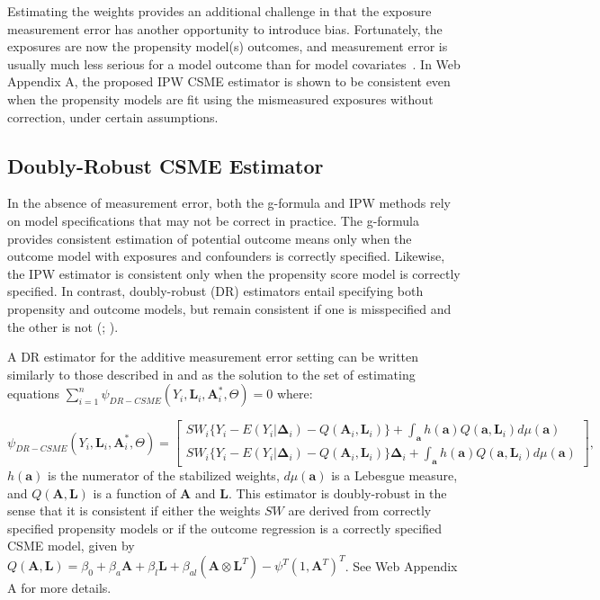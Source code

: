 \documentclass[useAMS,usenatbib,referee]{biom}
\begin{document}
Estimating the weights provides an additional challenge in that the exposure measurement error has another opportunity to introduce bias. Fortunately, the exposures are now the propensity model(s) outcomes, and measurement error is usually much less serious for a model outcome than for model covariates~\citep{carroll2006}. In Web Appendix A, the proposed IPW CSME estimator is shown to be consistent even when the propensity models are fit using the mismeasured exposures without correction, under certain assumptions.

\subsection{Doubly-Robust CSME Estimator}

In the absence of measurement error, both the g-formula and IPW methods rely on model specifications that may not be correct in practice. The g-formula provides consistent estimation of potential outcome means only when the outcome model with exposures and confounders is correctly specified. Likewise, the IPW estimator is consistent only when the propensity score model is correctly specified. In contrast, doubly-robust (DR) estimators entail specifying both propensity and outcome models, but remain consistent if one is misspecified and the other is not (\citealp*{robins1994}; \citealp{lunceford2004,bang2005}).

A DR estimator for the additive measurement error setting can be written similarly to those described in \citet{robins2000b} and \citet{neugebauer2005} as the solution to the set of estimating equations $\sum_{i=1}^{n} \psi_{DR-CSME}(Y_{i}, \bm{L}_{i}, \bm{A}^{*}_{i}, \Theta) = 0$ where:

\begin{equation*}
    \psi_{DR-CSME}(Y_{i}, \bm{L}_{i}, \bm{A}^{*}_{i}, \Theta) =
    \begin{bmatrix}
       SW_{i} \{ Y_{i} - E(Y_{i} | \bm{\Delta}_{i}) - Q(\bm{A}_{i}, \bm{L}_{i}) \} + \int_{\bm{a}} h(\bm{a})Q(\bm{a}, \bm{L}_{i})d\mu (\bm{a}) \\
       SW_{i} \{ Y_{i} - E(Y_{i} | \bm{\Delta}_{i}) - Q(\bm{A}_{i}, \bm{L}_{i}) \} \bm{\Delta}_{i} + \int_{\bm{a}} h(\bm{a})Q(\bm{a}, \bm{L}_{i})d\mu (\bm{a})
    \end{bmatrix},
\end{equation*}
$h(\bm{a})$ is the numerator of the stabilized weights, $d\mu (\bm{a})$ is a Lebesgue measure, and $Q(\bm{A}, \bm{L})$ is a function of $\bm{A}$ and $\bm{L}$. This estimator is doubly-robust in the sense that it is consistent if either the weights $SW$ are derived from correctly specified propensity models or if the outcome regression is a correctly specified CSME model, given by $Q(\bm{A}, \bm{L}) = \beta_{0} + \beta_{a}\bm{A} + \beta_{l}\bm{L} + \beta_{al}(\bm{A} \otimes \bm{L}^{T}) - \psi^{T}(1, \bm{A}^{T})^{T}$. See Web Appendix A for more details.
\end{document}
